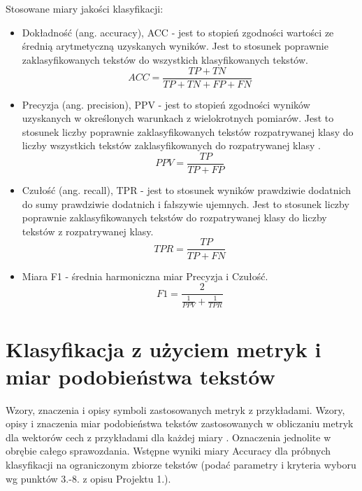 \documentclass{classrep}
\begin{document}
\ \\ \\ 
Stosowane miary jakości klasyfikacji:\\
\begin{itemize}
  \item Dokładność (ang. accuracy), ACC  - jest to stopień zgodności wartości ze średnią arytmetyczną uzyskanych wyników. Jest to stosunek poprawnie zaklasyfikowanych tekstów do wszystkich klasyfikowanych tekstów.
 \begin{equation}ACC = \frac{TP + TN}{TP + TN + FP + FN} \end{equation}
 \item Precyzja (ang. precision), PPV  - jest to stopień zgodności wyników uzyskanych w określonych warunkach z wielokrotnych pomiarów. Jest to stosunek liczby poprawnie zaklasyfikowanych tekstów rozpatrywanej klasy do liczby wszystkich tekstów zaklasyfikowanych do rozpatrywanej klasy . 
 \begin{equation} PPV =  \frac{TP} {TP+FP} \end{equation}
\item Czułość (ang. recall), TPR  - jest to stosunek wyników prawdziwie dodatnich do sumy prawdziwie dodatnich i fałszywie ujemnych. Jest to stosunek liczby poprawnie zaklasyfikowanych tekstów do rozpatrywanej klasy do liczby tekstów z rozpatrywanej klasy. 
 \begin{equation}   TPR = \frac{TP}{TP + FN} \end{equation}
\item Miara F1 - średnia harmoniczna miar Precyzja i Czułość. 
\begin{equation}   F1 = \frac{2}{\frac{1}{PPV} + \frac{1}{TPR}} \end{equation}
\end{itemize}


\section{Klasyfikacja z użyciem metryk i miar podobieństwa tekstów}
Wzory, znaczenia i opisy symboli zastosowanych metryk z
przykładami. Wzory, opisy i znaczenia miar
podobieństwa tekstów zastosowanych w obliczaniu metryk dla wektorów cech z
przykładami dla każdej miary \cite{niewiadomski08}.  Oznaczenia jednolite w obrębie całego sprawozdania.  Wstępne wyniki miary Accuracy dla próbnych klasyfikacji na ograniczonym zbiorze tekstów (podać parametry i kryteria
wyboru wg punktów 3.-8. z opisu Projektu 1.). \\ 
\end{document}
